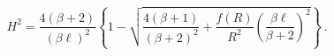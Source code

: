 \begin{equation}
H^2=\frac{4(\beta+2)}{(\beta\ell)^2}\left\{1-\sqrt{\frac{4(\beta+1)}{(\beta+2)^2}+
\frac{f(R)}{R^2}\left(\frac{\beta\ell}{\beta+2}\right)^2}\right\}\,.\end{equation}

